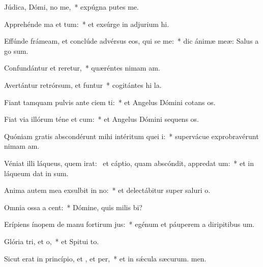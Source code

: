 \item Júdica, Dómi, no me,~* expúgna putes me.
\item Apprehénde ma et tum:~* et exsúrge in adjurium hi.
\item Effúnde frámeam, et conclúde advérsus eos, qui se me:~* dic ánimæ meæ: Salus a go sum.
\item Confundántur et reretur,~* quæréntes nimam am.
\item Avertántur retrórsum, et funtur~* cogitántes hi la.
\item Fiant tamquam pulvis ante ciem ti:~* et Angelus Dómini cotans os.
\item Fiat via illórum téne et cum:~* et Angelus Dómini sequens os.
\item Quóniam gratis abscondérunt mihi intéritum quei i:~* supervácue exprobravérunt nimam am.
\item Véniat illi láqueus, quem irat:~\pscross{} et cáptio, quam abscóndit, appredat um:~* et in láqueum dat in sum.
\item Anima autem mea exsulbit in no:~* et delectábitur super saluri o.
\item Omnia ossa a cent:~* Dómine, quis milis bi?
\item Erípiens ínopem de manu fortirum jus:~* egénum et páuperem a diripitibus um.
\item Glória tri, et o,~* et Spitui to.
\item Sicut erat in princípio, et , et per,~* et in sǽcula sæcurum. men.
